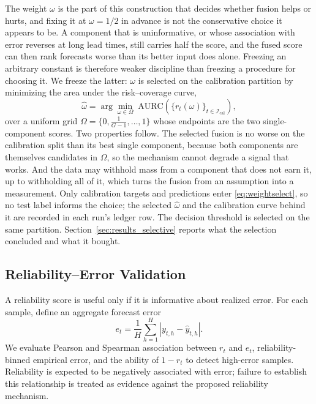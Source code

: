 The weight $\omega$ is the part of this construction that decides whether fusion helps or hurts, and fixing it at $\omega=1/2$ in advance is not the conservative choice it appears to be. A component that is uninformative, or whose association with error reverses at long lead times, still carries half the score, and the fused score can then rank forecasts worse than its better input does alone. Freezing an arbitrary constant is therefore weaker discipline than freezing a procedure for choosing it. We freeze the latter: $\omega$ is selected on the calibration partition by minimizing the area under the risk--coverage curve,
\begin{equation}
\hat{\omega}=\arg\min_{\omega\in\Omega}\;\mathrm{AURC}\!\left(\{r_t(\omega)\}_{t\in\mathcal{I}_{\mathrm{cal}}}\right),
\label{eq:weightselect}
\end{equation}
over a uniform grid $\Omega=\{0,\tfrac{1}{G-1},\ldots,1\}$ whose endpoints are the two single-component scores. Two properties follow. The selected fusion is no worse on the calibration split than its best single component, because both components are themselves candidates in $\Omega$, so the mechanism cannot degrade a signal that works. And the data may withhold mass from a component that does not earn it, up to withholding all of it, which turns the fusion from an assumption into a measurement. Only calibration targets and predictions enter \eqref{eq:weightselect}, so no test label informs the choice; the selected $\hat{\omega}$ and the calibration curve behind it are recorded in each run's ledger row. The decision threshold is selected on the same partition. Section~\ref{sec:results_selective} reports what the selection concluded and what it bought.

\subsection{Reliability--Error Validation}
A reliability score is useful only if it is informative about realized error. For each sample, define an aggregate forecast error
\begin{equation}
e_t=\frac{1}{H}\sum_{h=1}^{H}|y_{t,h}-\hat{y}_{t,h}|.
\end{equation}
We evaluate Pearson and Spearman association between $r_t$ and $e_t$, reliability-binned empirical error, and the ability of $1-r_t$ to detect high-error samples. Reliability is expected to be negatively associated with error; failure to establish this relationship is treated as evidence against the proposed reliability mechanism.

